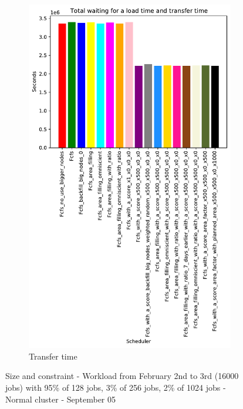 \documentclass[a4paper]{article}
\begin{document}
\begin{figure}[H]
\begin{subfigure}[b]{0.4\linewidth}\centering\includegraphics[width=0.7\linewidth]{MBSS/plot/Results_Size_And_Data_2022-02-02->2022-02-03_V9532_Total_waiting_for_a_load_time_and_transfer_time_450_128_32_256_4_1024.pdf}\caption{Transfer time}\label{45}\end{subfigure}
\caption{Size and constraint - Workload from February 2nd to 3rd (16000 jobs) with 95\% of 128 jobs, 3\% of 256 jobs, 2\% of 1024 jobs - Normal cluster - September 05}\label{49}\end{figure}
\end{document}
